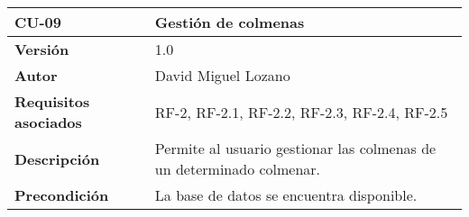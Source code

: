\begin{longtable}[H]{@{}ll@{}}
\toprule
\begin{minipage}[b]{0.21\columnwidth}\raggedright\strut
\textbf{CU-09}\strut
\end{minipage} & \begin{minipage}[b]{0.73\columnwidth}\raggedright\strut
\textbf{Gestión de colmenas}\strut
\end{minipage}\tabularnewline
\midrule
\endhead
\begin{minipage}[t]{0.21\columnwidth}\raggedright\strut
\textbf{Versión}\strut
\end{minipage} & \begin{minipage}[t]{0.73\columnwidth}\raggedright\strut
1.0\strut
\end{minipage}\tabularnewline
\begin{minipage}[t]{0.21\columnwidth}\raggedright\strut
\textbf{Autor}\strut
\end{minipage} & \begin{minipage}[t]{0.73\columnwidth}\raggedright\strut
David Miguel Lozano\strut
\end{minipage}\tabularnewline
\begin{minipage}[t]{0.21\columnwidth}\raggedright\strut
\textbf{Requisitos asociados}\strut
\end{minipage} & \begin{minipage}[t]{0.73\columnwidth}\raggedright\strut
RF-2, RF-2.1, RF-2.2, RF-2.3, RF-2.4, RF-2.5\strut
\end{minipage}\tabularnewline
\begin{minipage}[t]{0.21\columnwidth}\raggedright\strut
\textbf{Descripción}\strut
\end{minipage} & \begin{minipage}[t]{0.73\columnwidth}\raggedright\strut
Permite al usuario gestionar las colmenas de un determinado
colmenar.\strut
\end{minipage}\tabularnewline
\begin{minipage}[t]{0.21\columnwidth}\raggedright\strut
\textbf{Precondición}\strut
\end{minipage} & \begin{minipage}[t]{0.73\columnwidth}\raggedright\strut
La base de datos se encuentra disponible.


\end{minipage}
\end{longtable}
